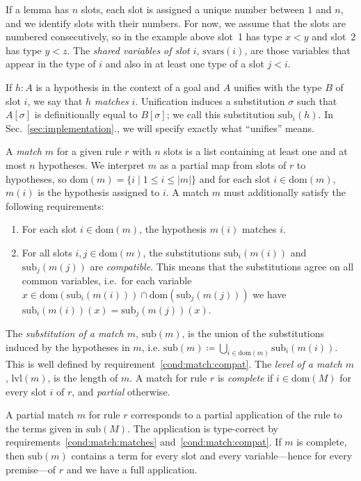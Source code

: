 \documentclass[runningheads,leqno]{llncs}
\newcommand{\vars}{\ensuremath{\mathrm{svars}}}
\newcommand{\dom}{\ensuremath{\mathrm{dom}}}
\newcommand{\sub}{\ensuremath{\mathrm{sub}}}
\newcommand{\lvl}{\ensuremath{\mathrm{lvl}}}
\begin{document}
If a lemma has $n$ slots, each slot is assigned a unique number between $1$ and $n$, and we identify slots with their numbers.
For now, we assume that the slots are numbered consecutively, so in the example above slot~1 has type $x < y$ and slot~2 has type $y < z$.
The \emph{shared variables of slot $i$}, $\vars(i)$, are those variables that appear in the type of $i$ and also in at least one type of a slot $j < i$.

If $h : A$ is a hypothesis in the context of a goal and $A$ unifies with the type $B$ of slot $i$, we say that $h$ \emph{matches} $i$.
Unification induces a substitution $σ$ such that $A[σ]$ is definitionally equal to $B[σ]$; we call this substitution $\sub_{i}(h)$.
In Sec.~\ref{sec:implementation}., we will specify exactly what \enquote{unifies} means.

A \textit{match} $m$ for a given rule $r$ with $n$ slots is a list containing at least one and at most $n$ hypotheses.
We interpret $m$ as a partial map from slots of $r$ to hypotheses, so $\dom(m) = \{i \mid 1 ≤ i ≤ |m| \}$ and for each slot $i ∈ \dom(m)$, $m(i)$ is the hypothesis assigned to $i$.
A match $m$ must additionally satisfy the following requirements:
\begin{enumerate}
  \item\label{cond:match:matches} For each slot $i ∈ \dom(m)$, the hypothesis $m(i)$ matches $i$.

  \item\label{cond:match:compat} For all slots $i,j ∈ \dom(m)$, the substitutions $\sub_{i}(m(i))$ and $\sub_{j}(m(j))$ are \emph{compatible}.
        This means that the substitutions agree on all common variables, i.e.\ for each variable $x ∈ \dom(\sub_{i}(m(i))) ∩ \dom(\sub_{j}(m(j)))$ we have $\sub_{i}(m(i))(x) = \sub_{j}(m(j))(x)$.
\end{enumerate}
The \emph{substitution of a match $m$}, $\sub(m)$, is the union of the substitutions induced by the hypotheses in $m$, i.e. $\sub(m) ≔ ⋃_{i ∈ \dom(m)}\sub_{i}(m(i))$.
This is well defined by requirement~\ref{cond:match:compat}.
The \textit{level of a match $m$}, $\lvl(m)$, is the length of $m$.
A match for rule $r$ is \textit{complete} if $i ∈ \dom(M)$ for every slot $i$ of $r$, and \emph{partial} otherwise.

A partial match $m$ for rule $r$ corresponds to a partial application of the rule to the terms given in $\sub(M)$.
The application is type-correct by requirements~\ref{cond:match:matches} and~\ref{cond:match:compat}.
If $m$ is complete, then $\sub(m)$ contains a term for every slot and every variable---hence for every premise---of $r$ and we have a full application.
\end{document}
